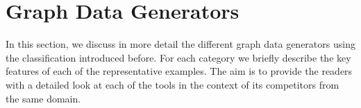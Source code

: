 \section{Graph Data Generators}
\label{sec:generators}

In this section, we discuss in more detail the different graph data generators using the classification introduced before. For each category we briefly describe the key features of each of the representative examples. The aim is to provide the readers with a detailed look at each of the tools in the context of its competitors from the same domain.










%






